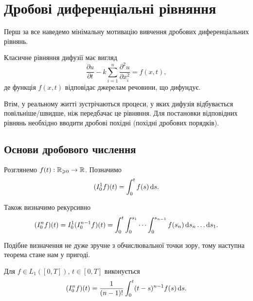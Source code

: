 
\section{Дробові диференціальні рівняння}

Перш за все наведемо мінімальну мотивацію вивчення дробових диференціальних рівнянь.

\begin{reminder}
    Класичне рівняння дифузії має вигляд
    \begin{equation}
        \label{eq:classical-diffusion}
        \frac{\partial u}{\partial t} - k \sum_{i = 1}^n \frac{\partial^2 u}{\partial x_i^2} = f(x, t),
    \end{equation}
    де функція $f(x, t)$ відповідає джерелам речовини, що дифундує.
\end{reminder}

Втім, у реальному житті зустрічаються процеси, у яких дифузія відбувається повільніше/швидше, ніж передбачає це рівняння. Для постановки відповідних рівнянь необхідно вводити дробові похідні (похідні дробових порядків).

\subsection{Основи дробового числення}

Розглянемо $f(t): \mathbb{R}_{\geqslant 0} \to \mathbb{R}$. Позначимо
\begin{equation}
    (I_0^{1} f)(t) = \int_0^t f(s) \mathop{}\!\mathrm{d} s.
\end{equation}

Також визначимо рекурсивно
\begin{equation}
    (I_0^{n} f)(t) = I_0^{1} (I_0^{n - 1} f)(t) = \int_0^t \int_0^{s_1} \cdots \int_0^{s_{n - 1}} f(s_n) \mathop{}\!\mathrm{d} s_n \ldots \mathop{}\!\mathrm{d} s_1.
\end{equation}

Подібне визначення не дуже зручне з обчислювальної точки зору, тому наступна теорема стане нам у пригоді.

\begin{th_formula}
    Для $f \in L_1([0, T])$, $t \in [0, T]$ виконується
    \begin{equation}
        (I_0^{n} f)(t) = \frac{1}{(n - 1)!} \int_0^t (t - s)^{n - 1} f(s) \mathop{}\!\mathrm{d} s.
    \end{equation}
\end{th_formula}

